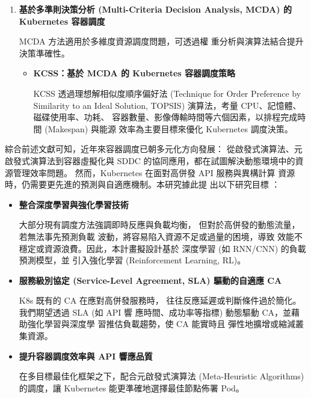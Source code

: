\documentclass[12pt,a4paper]{article}
\begin{document}
\begin{enumerate}[label={(\zhdig*)}, leftmargin=2\parindent, listparindent=\parindent]
\begin{enumerate}[label={(\arabic*)}, leftmargin=\parindent, listparindent=\parindent]
\begin{enumerate}[label={(\zhdig*)}, leftmargin=\parindent, listparindent=\parindent]
\begin{itemize}[leftmargin=\parindent, listparindent=\parindent]
\end{itemize}
\item \textbf{基於多準則決策分析 (Multi-Criteria Decision Analysis, MCDA)
    的 Kubernetes 容器調度}

MCDA 方法適用於多維度資源調度問題，可透過權
重分析與演算法結合提升決策準確性。
\begin{itemize}[leftmargin=\parindent, listparindent=\parindent]
    \item \textbf{\cite{17} KCSS：基於 MCDA 的 Kubernetes 容器調度策略}

    KCSS 透過理想解相似度順序偏好法
    (Technique for Order Preference by Similarity to an Ideal Solution,
    TOPSIS) 演算法，考量 CPU、記憶體、磁碟使用率、功耗、
    容器數量、影像傳輸時間等六個因素，以排程完成時間 (Makespan) 與能源
    效率為主要目標來優化 Kubernetes 調度決策。

\end{itemize}

\end{enumerate}

綜合前述文獻可知，近年來容器調度已朝多元化方向發展：
從啟發式演算法、元啟發式演算法到容器虛擬化與 SDDC
的協同應用，都在試圖解決動態環境中的資源管理效率問題。
然而，Kubernetes 在面對高併發 API 服務與異構計算
資源時，仍需要更先進的預測與自適應機制。本研究據此提
出以下研究目標 ：
\begin{itemize}[leftmargin=\parindent, listparindent=\parindent]
    \item\textbf{整合深度學習與強化學習技術}

大部分現有調度方法強調即時反應與負載均衡，
但對於高併發的動態流量，若無法事先預測負載
波動，將容易陷入資源不足或過量的困境，導致
效能不穩定或資源浪費。因此，本計畫擬設計基於
深度學習 (如 RNN/CNN) 的負載預測模型，並
引入強化學習 (Reinforcement Learning, RL)。

    \item\textbf{服務級別協定 (Service-Level Agreement, SLA) 驅動的自適應 CA}

K8s 既有的 CA 在應對高併發服務時，
往往反應延遲或判斷條件過於簡化。
我們期望透過 SLA (如 API 響
應時間、成功率等指標) 動態驅動
CA，並藉助強化學習與深度學
習推估負載趨勢，使 CA 能實時且
彈性地擴增或縮減叢集資源。

    \item\textbf{提升容器調度效率與 API 響應品質}

在多目標最佳化框架之下，配合元啟發式演算法 (Meta-Heuristic Algorithms)
的調度，讓 Kubernetes 能更準確地選擇最佳節點佈署 Pod。


\end{itemize}
\end{enumerate}
\end{enumerate}
\end{document}

